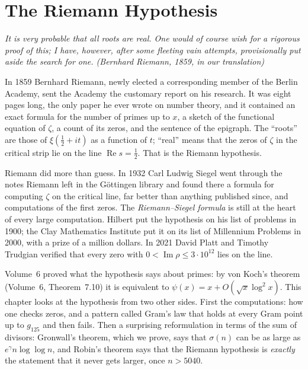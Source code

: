 \chapter{The Riemann Hypothesis}\label{conjectures:ch:riemann}

\begin{center}\itshape
It is very probable that all roots are real. One would of course wish for a rigorous proof of this; I have, however, after some fleeting vain attempts,
provisionally put aside the search for one.
\upshape(Bernhard Riemann, 1859, in our translation)
\end{center}

In 1859 Bernhard Riemann, newly elected a corresponding member of the Berlin Academy, sent the Academy the customary report on his research. It was
eight pages long, the only paper he ever wrote on number theory, and it contained an exact formula for the number of primes up to $x$, a sketch of
the functional equation of $\zeta$, a count of its zeros, and the sentence of the epigraph. The ``roots'' are those of $\xi(\frac12+it)$ as a function of
$t$; ``real'' means that the zeros of $\zeta$ in the critical strip lie on the line $\operatorname{Re}s=\frac12$. That is the Riemann hypothesis.

Riemann did more than guess. In 1932 Carl Ludwig Siegel went through the notes Riemann left in the G\"ottingen library and found there a formula for
computing $\zeta$ on the critical line, far better than anything published since, and computations of the first zeros. The \emph{Riemann--Siegel
formula} is still at the heart of every large computation. Hilbert put the hypothesis on his list of problems in 1900; the Clay Mathematics Institute
put it on its list of Millennium Problems in 2000, with a prize of a million dollars. In 2021 David Platt and Timothy Trudgian verified that every zero
with $0<\operatorname{Im}\rho\le3\cdot10^{12}$ lies on the line.

Volume~6 proved what the hypothesis says about primes: by von Koch's theorem (Volume~6, Theorem~7.10) it is equivalent to
$\psi(x)=x+O(\sqrt x\log^2x)$. This chapter looks at the hypothesis from two other sides. First the computations: how one checks zeros, and a pattern
called Gram's law that holds at every Gram point up to $g_{125}$ and then fails. Then a surprising reformulation in terms of the sum of divisors: Gronwall's
theorem, which we prove, says that $\sigma(n)$ can be as large as $e^\gamma n\log\log n$, and Robin's theorem says that the Riemann hypothesis is
\emph{exactly} the statement that it never gets larger, once $n>5040$.


